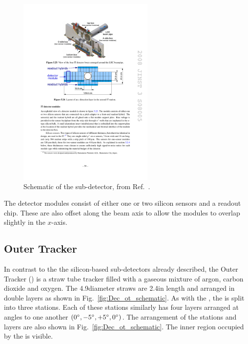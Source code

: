 \begin{figure}[!h]
    \centering
    \includegraphics[width=0.6\textwidth]{figs/Detector/it_layout.pdf}
    \caption{Schematic of the \intr sub-detector, from Ref.~\cite{Alves:2008zz}.}
    \label{fig:Dec_it_layout}   
\end{figure}

The detector modules consist of either one or two silicon sensors and a readout chip. These are also offset along the beam axis to allow the modules to overlap slightly in the $x$-axis.



\subsection{Outer Tracker}

In contrast to the the silicon-based sub-detectors already described, the Outer Tracker (\ot) is a straw tube tracker filled with a gaseous mixture of argon, carbon dioxide and oxygen. The 4.9\mm diameter straws are 2.4\m in length and arranged in double layers as shown in Fig.~\ref{fig:Dec_ot_schematic}. As with the \intr, the \ot is split into three stations. Each of these stations similarly has four layers arranged at angles to one another $(0^{\circ},-5^{\circ},+5^{\circ},0^{\circ})$. The arrangement of the stations and layers are also shown in Fig.~\ref{fig:Dec_ot_schematic}. The inner region occupied by the \intr is visible.

